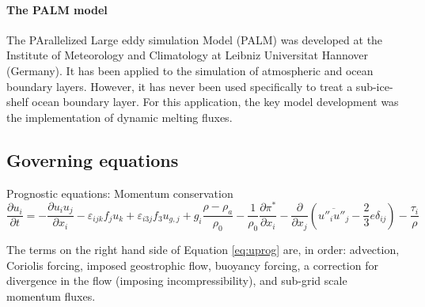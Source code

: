\documentclass[draft]{styles/agujournal2019}
\begin{document}
\paragraph{The PALM model}
The PArallelized Large eddy simulation Model (PALM) was developed at the Institute of Meteorology and Climatology at Leibniz Universitat Hannover (Germany). It has been applied to the simulation of atmospheric and ocean boundary layers. However, it has never been used specifically to treat a sub-ice-shelf ocean boundary layer. For this application, the key model development was the implementation of dynamic melting fluxes. 

\subsection{Governing equations}


Prognostic equations:
Momentum conservation
\begin{equation} \label{eq:uprog}
	\frac{\partial u_i}{\partial t} = 
	-\frac{\partial u_i u_j}{\partial x_i}
	-\varepsilon_{ijk} f_j u_k 
	+ \varepsilon_{i3j} f_3 u_{g,j} 
    + g_i \frac{\rho - \rho_a}{\rho_0}
	- \frac{1}{\rho_0}\frac{\partial \pi^*}{\partial x_i}
	- \frac{\partial}{\partial x_j}(\overline{u''_i u''_j} - \frac{2}{3}e\delta_{ij})
	- \frac{\tau_i}{\rho}
\end{equation}
	
The terms on the right hand side of Equation \ref{eq:uprog} are, in order: advection, Coriolis forcing, imposed geostrophic flow, buoyancy forcing, a correction for divergence in the flow (imposing incompressibility), and sub-grid scale momentum fluxes. 
\end{document}
